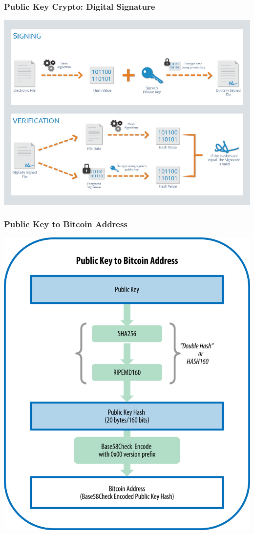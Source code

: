 \begin{frame}
\begin{columns}
\begin{column}{0.65\textwidth}
\begin{center}
            \end{center}
        \end{column}
    \end{columns}
\end{frame}

\begin{frame}
    \frametitle{Public Key Crypto: Digital Signature}
    \includegraphics[scale=0.3]{./figures/digital-signatures-methodology.jpg}
\end{frame}

\begin{frame}
    \frametitle{Public Key to Bitcoin Address}
    \includegraphics[scale=0.5]{./figures/mbc2_0405.png}
\end{frame}

